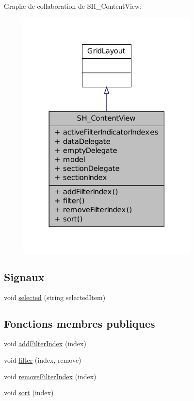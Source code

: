 Graphe de collaboration de S\-H\-\_\-\-Content\-View\-:\nopagebreak
\begin{figure}[H]
\begin{center}
\leavevmode
\includegraphics[width=258pt]{classSH__ContentView__coll__graph}
\end{center}
\end{figure}
\subsection*{Signaux}
\begin{DoxyCompactItemize}
\item 
void \hyperlink{classSH__ContentView_a85c8e92ea6e076446a3b0415d758350f}{selected} (string selected\-Item)
\end{DoxyCompactItemize}
\subsection*{Fonctions membres publiques}
\begin{DoxyCompactItemize}
\item 
void \hyperlink{classSH__ContentView_ac6937d4b79d1b7fb205b69f6bd12c29f}{add\-Filter\-Index} (index)
\item 
void \hyperlink{classSH__ContentView_a281e67d2abc15c9e81895284717bce43}{filter} (index, remove)
\item 
void \hyperlink{classSH__ContentView_a9edbc3b09400eed69c0d6d5be1f40e39}{remove\-Filter\-Index} (index)
\item 
void \hyperlink{classSH__ContentView_a32bbe22a5ea495a3fdb935e1dcc97bba}{sort} (index)
\end{DoxyCompactItemize}
